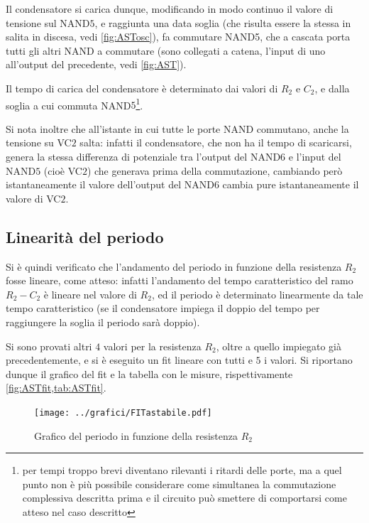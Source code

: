 \documentclass[a4paper,10pt]{article}
\begin{document}
Il condensatore si carica dunque, modificando in modo continuo il valore di tensione sul NAND$5$, e raggiunta una data soglia (che risulta essere la stessa in salita in discesa, vedi \cref{fig:ASTosc}), fa commutare NAND5, che a cascata porta tutti gli altri NAND a commutare (sono collegati a catena, l'input di uno all'output del precedente, vedi \cref{fig:AST}).

Il tempo di carica del condensatore è determinato dai valori di $R_2$ e $C_2$, e dalla soglia a cui commuta NAND$5$\footnote{per tempi troppo brevi diventano rilevanti i ritardi delle porte, ma a quel punto non è più possibile considerare come simultanea la commutazione complessiva descritta prima e il circuito può smettere di comportarsi come atteso nel caso descritto}.

Si nota inoltre che all'istante in cui tutte le porte NAND commutano, anche la tensione su VC$2$ salta: infatti il condensatore, che non ha il tempo di scaricarsi, genera la stessa differenza di potenziale tra l'output del NAND$6$ e l'input del NAND$5$ (cioè VC$2$) che generava prima della commutazione, cambiando però istantaneamente il valore dell'output del NAND$6$ cambia pure istantaneamente il valore di VC$2$.

\subsection{Linearità del periodo}
Si è quindi verificato che l'andamento del periodo in funzione della resistenza $R_2$ fosse lineare, come atteso: infatti l'andamento del tempo caratteristico del ramo $R_2-C_2$ è lineare nel valore di $R_2$, ed il periodo è determinato linearmente da tale tempo caratteristico (se il condensatore impiega il doppio del tempo per raggiungere la soglia il periodo sarà doppio).

Si sono provati altri $4$ valori per la resistenza $R_2$, oltre a quello impiegato già precedentemente, e si è eseguito un fit lineare con tutti e $5$ i valori. Si riportano dunque il grafico del fit e la tabella con le misure, rispettivamente \cref{fig:ASTfit,tab:ASTfit}.

\begin{figure}[H]
	\centering
	\begin{minipage}{0.49\textwidth}
		\centering
		\texttt{[image: ../grafici/FITastabile.pdf]}
		\caption{Grafico del periodo in funzione della resistenza $R_2$}
		\label{fig:ASTfit}
	\end{minipage}
	\begin{minipage}{0.49\textwidth}
		\centering
		\resizebox{0.7\textwidth}{!}{
			}
		\label{tab:ASTfit}
	\end{minipage}
\end{figure}
\end{document}
